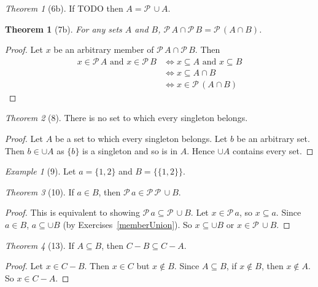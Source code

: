 \documentclass[12pt]{article}
\theoremstyle{plain}
\newtheorem{thm}{Theorem}[section]
\theoremstyle{remark}
\newtheorem*{exthm}{Theorem}
\newtheorem*{eg}{Example}
\theoremstyle{definition}
\theoremstyle{remark}
\newcommand{\powerset}{\mathscr{P}\,}
\renewcommand{\iff}{\Leftrightarrow}
\begin{document}
\begin{exthm}[6b]
 If TODO then $A = \powerset \cup A$.
\end{exthm}


\begin{thm}[7b]
 For any sets $A$ and $B$, $\powerset A \cap \powerset B = \powerset (A \cap B)$.
\end{thm}
\begin{proof}
 Let $x$ be an arbitrary member of $\powerset A \cap \powerset B$. Then
 \begin{align*}
  x \in \powerset A \text{ and } x \in \powerset B &\Leftrightarrow
  x \subseteq A \text { and } x \subseteq B\\
                                                   &\Leftrightarrow x \subseteq A \cap B\\
                                                   &\iff x \in \powerset (A \cap B)
 \end{align*}
\end{proof}

\begin{exthm}[8]
 There is no set to which every singleton belongs.
\end{exthm}
\begin{proof}
 Let $A$ be a set to which every singleton belongs. Let $b$ be an arbitrary set. Then $b \in \cup A$ as $\{b\}$ is a singleton and so is in $A$. Hence $\cup A$ contains every set.
\end{proof}

\begin{eg}[9]
 Let $a = \{1,2\}$ and $B = \{\{1,2\}\}$.
\end{eg}

\begin{exthm}[10]
 If $a \in B$, then $\powerset a \in \powerset \powerset \cup B$.
\end{exthm}

\begin{proof}
 This is equivalent to showing $\powerset a \subseteq \powerset \cup B$. Let $x \in \powerset a$, so $x \subseteq a$. Since $a \in B$, $a \subseteq \cup B$ (by Exercises~\ref{memberUnion}). So $x \subseteq \cup B$ or $x \in \powerset \cup B$.
\end{proof}

\begin{exthm}[13]
 If $A \subseteq B$, then $C - B \subseteq C - A$.
\end{exthm}
\begin{proof}
 Let $x \in C - B$. Then $x \in C$ but $x \not\in B$. Since $A \subseteq B$, if $x \not\in B$, then $x \not\in A$. So $x \in C - A$.
\end{proof}
\end{document}
